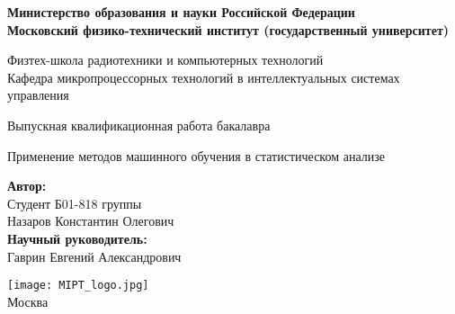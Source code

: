 \begin{center}
    \large\textbf{Министерство образования и науки Российской Федерации \\
        Московский физико-технический институт (государственный
        университет)} \\
    \vspace{1cm}

    Физтех-школа радиотехники и компьютерных технологий \\

    Кафедра микропроцессорных технологий в интеллектуальных системах управления \\

    \vspace{3em}

    Выпускная квалификационная работа бакалавра
\end{center}

\begin{center}
    \vspace{\fill}
    \LARGE{Применение методов машинного обучения в статистическом анализе}

    \vspace{\fill}
\end{center}


\begin{flushright}
    \textbf{Автор:} \\
    Студент Б01-818 группы \\
    Назаров Константин Олегович \\
    \vspace{2em}
    \textbf{Научный руководитель:} \\
    Гаврин Евгений Александрович  \\
\end{flushright}

\vspace{7em}

\begin{center}
    \texttt{[image: MIPT\_logo.jpg]}\\
    Москва \the\year{}
\end{center}

\thispagestyle{empty}

\newpage
\setcounter{page}{2}
